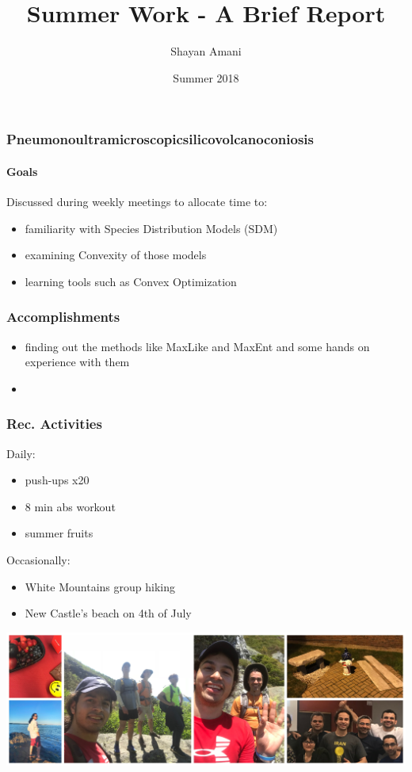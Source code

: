 \documentclass{beamer}
\title{Summer Work - A Brief Report}
\author{Shayan Amani\\}
\date{Summer 2018}
\institute{Department of Computer Science, University of New Hampshire}
\begin{document}
  \begin{frame}
    \titlepage
  \end{frame}

\begin{frame}
    \frametitle{Pneumonoultramicroscopicsilicovolcanoconiosis}
    \framesubtitle{Goals}
    Discussed during weekly meetings to allocate time to:
    \begin{itemize}
    \item familiarity with Species Distribution Models (SDM)
    \item examining Convexity of those models
    \item learning tools such as Convex Optimization
  \end{itemize}
  \end{frame}
  
  \begin{frame}
  	\frametitle{Accomplishments}
  \end{frame}
  \begin{itemize}
    \item finding out the methods like MaxLike and MaxEnt and some hands on experience with them
    \item 
  \end{itemize}
  \begin{frame}
  	\frametitle{Rec. Activities}
    Daily:
    \begin{itemize}
    \item push-ups x20
    \item 8 min abs workout
    \item summer fruits
    \end{itemize}
    Occasionally:
    \begin{itemize}
    \item White Mountains group hiking
    \item New Castle's beach on 4th of July
    \end{itemize}
	\includegraphics[scale=0.45]{img.jpg}
  \end{frame}
  
\end{document}
